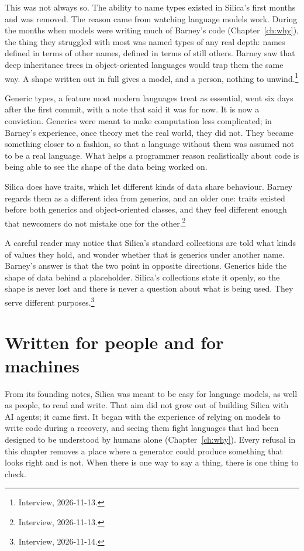 This was not always so. The ability to name types existed in Silica's first
months and was removed. The reason came from watching language models work.
During the months when models were writing much of Barney's code
(Chapter~\ref{ch:why}), the thing they struggled with most was named types of
any real depth: names defined in terms of other names, defined in terms of still
others. Barney saw that deep inheritance trees in object-oriented languages
would trap them the same way. A shape written out in full gives a model, and a
person, nothing to unwind.\footnote{Interview, 2026-11-13.}

Generic types, a feature most modern languages treat as essential, went six days
after the first commit, with a note that said it was for now. It is now a
conviction. Generics were meant to make computation less complicated; in
Barney's experience, once theory met the real world, they did not. They became
something closer to a fashion, so that a language without them was assumed not
to be a real language. What helps a programmer reason realistically about code
is being able to see the shape of the data being worked on.

Silica does have traits, which let different kinds of data share behaviour.
Barney regards them as a different idea from generics, and an older one: traits
existed before both generics and object-oriented classes, and they feel
different enough that newcomers do not mistake one for the
other.\footnote{Interview, 2026-11-13.}

A careful reader may notice that Silica's standard collections are told what
kinds of values they hold, and wonder whether that is generics under another
name. Barney's answer is that the two point in opposite directions. Generics
hide the shape of data behind a placeholder. Silica's collections state it
openly, so the shape is never lost and there is never a question about what is
being used. They serve different purposes.\footnote{Interview, 2026-11-14.}

\section{Written for people and for machines}

From its founding notes, Silica was meant to be easy for language models, as
well as people, to read and write. That aim did not grow out of building Silica
with AI agents; it came first. It began with the experience of relying on models
to write code during a recovery, and seeing them fight languages that had been
designed to be understood by humans alone (Chapter~\ref{ch:why}). Every refusal
in this chapter removes a place where a generator could produce something that
looks right and is not. When there is one way to say a thing, there is one thing
to check.


